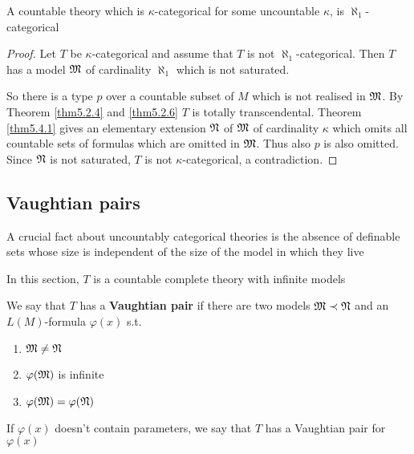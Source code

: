 \documentclass[11pt]{article}
\begin{document}
\begin{corollary}[]
A countable theory which is \(\kappa\)-categorical for some uncountable \(\kappa\), is \(\aleph_1\)-categorical
\end{corollary}

\begin{proof}
Let \(T\) be \(\kappa\)-categorical and assume that \(T\) is not \(\aleph_1\)-categorical. Then \(T\) has a
model \(\mathfrak{M}\) of cardinality \(\aleph_1\) which is not saturated.
\begin{center}\end{center}
So there is a type \(p\) over a countable subset of \(M\) which is not realised in \(\mathfrak{M}\). By
Theorem \ref{thm5.2.4} and \ref{thm5.2.6} \(T\) is totally transcendental. Theorem \ref{thm5.4.1}
gives an elementary extension \(\mathfrak{N}\) of \(\mathfrak{M}\) of cardinality \(\kappa\) which omits all countable sets of
formulas which are omitted in \(\mathfrak{M}\). Thus also \(p\) is also omitted. Since \(\mathfrak{N}\) is not
saturated, \(T\) is not \(\kappa\)-categorical, a contradiction.
\end{proof}

\subsection{Vaughtian pairs}
\label{sec:orgd80e3d5}
A crucial fact about uncountably categorical theories is the absence of definable sets whose
size is independent of the size of the model in which they live

In this section, \(T\) is a countable complete theory with infinite models

\begin{definition}[]
We say that \(T\) has a \textbf{Vaughtian pair} if there are two models \(\mathfrak{M}\prec\mathfrak{N}\) and
an \(L(M)\)-formula \(\varphi(x)\) s.t.
\begin{enumerate}
\item \(\mathfrak{M}\neq\mathfrak{N}\)
\item \(\varphi(\mathfrak{M})\) is infinite
\item \(\varphi(\mathfrak{M})=\varphi(\mathfrak{N})\)
\end{enumerate}


If \(\varphi(x)\) doesn't contain parameters, we say that \(T\) has a Vaughtian pair for \(\varphi(x)\)
\end{definition}
\end{document}

